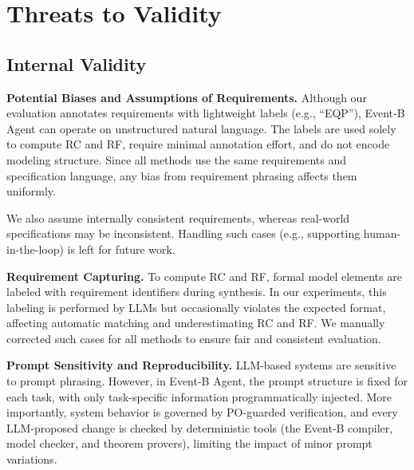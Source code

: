 \section{Threats to Validity}

\subsection{Internal Validity}

\noindent\textbf{Potential Biases and Assumptions of Requirements.}
Although our evaluation annotates requirements with lightweight labels (e.g., ``EQP''), Event-B Agent can operate on unstructured natural language.
The labels are used solely to compute RC and RF, require minimal annotation effort, and do not encode modeling structure.
Since all methods use the same requirements and specification language, any bias from requirement phrasing affects them uniformly.

We also assume internally consistent requirements, whereas real-world specifications may be inconsistent.
Handling such cases (e.g., supporting human-in-the-loop) is left for future work.




\noindent\textbf{Requirement Capturing.}
To compute RC and RF, formal model elements are labeled with requirement identifiers during synthesis.
In our experiments, this labeling is performed by LLMs but occasionally violates the expected format, affecting automatic matching and underestimating RC and RF.
We manually corrected such cases for all methods to ensure fair and consistent evaluation.



\noindent \textbf{Prompt Sensitivity and Reproducibility.}
LLM-based systems are sensitive to prompt phrasing.
However, in Event-B Agent, the prompt structure is fixed for each task, with only task-specific information programmatically injected.
More importantly, system behavior is governed by PO-guarded verification, and every LLM-proposed change is checked by deterministic tools (the Event-B compiler, model checker, and theorem provers), limiting the impact of minor prompt variations.

